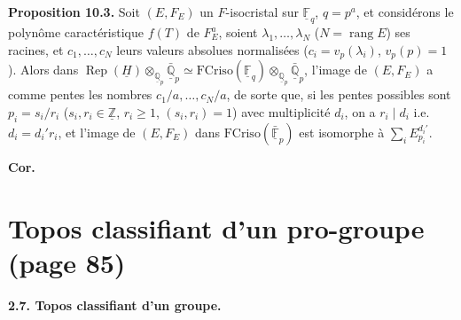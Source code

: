 \documentclass[11pt,a4paper]{article}
\begin{document}
\textbf{Proposition 10.3.} Soit $(E, F_{E})$ un $F$-isocristal sur
$\underline{\mathbb{F}}_{q}$, $q = p^{a}$, et considérons le polynôme
caractéristique $f(T)$ de $F_{E}^{a}$, soient $\lambda_{1}, \dots,
\lambda_{N}$ ($N = \operatorname{rang} E$) ses racines, et
$c_{1}, \dots, c_{N}$ leurs valeurs absolues normalisées
($c_{i} = v_{p}(\lambda_{i})$, $v_{p}(p) = 1$). Alors  dans
$\operatorname{Rep}(\underline{H})
\otimes_{\underline{\mathbb{Q}}_{p}} \bar{\underline{\mathbb{Q}}}_{p}
\simeq \mathrm{FCriso}(\underline{\mathbb{F}}_{q})
\otimes_{\underline{\mathbb{Q}}_{p}} \bar{\underline{\mathbb{Q}}}_{p}$,
l'image de $(E, F_{E})$ a comme pentes les nombres
$c_{1}/a, \dots, c_{N}/a$, de sorte que, si les  pentes
possibles sont 
$p_{i} = s_{i}/r_{i}$ ($s_{i}, r_{i} \in \underline{\mathbb{Z}}$,
$r_{i} \geq 1$, $(s_{i}, r_{i}) = 1$) avec multiplicité $d_{i}$, on a
$r_{i} \mid d_{i}$ i.e.\ $d_{i} = d_{i}' r_{i}$, et l'image de $(E, F_{E})$
dans $\mathrm{FCriso}(\bar{\underline{\mathbb{F}}}_{p})$ est isomorphe à
$\sum_{i} E_{p_{i}}^{d_{i}'}$.

\textbf{Cor.}

\section*{Topos classifiant d'un pro-groupe (page 85)}


\textbf{2.7. Topos classifiant d'un  groupe.}
\end{document}
